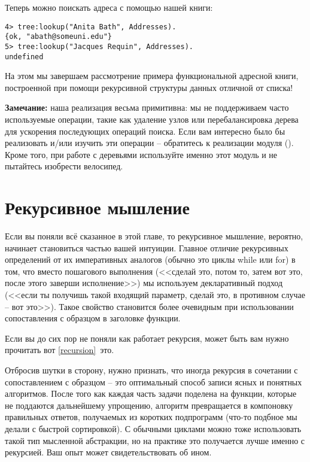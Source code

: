 Теперь можно поискать адреса с помощью нашей книги:
\begin{lstlisting}[style=erlang]
4> tree:lookup("Anita Bath", Addresses).
{ok, "abath@someuni.edu"}
5> tree:lookup("Jacques Requin", Addresses).
undefined
\end{lstlisting}

На этом мы завершаем рассмотрение примера функциональной адресной книги, построенной при помощи рекурсивной структуры данных отличной от списка!\\
\colorbox{lgray}
{
    \begin{minipage}{\linewidth}
\textbf{Замечание:} наша реализация весьма примитивна: мы не поддерживаем часто используемые операции, такие как удаление узлов или перебалансировка дерева для ускорения последующих операций поиска.
Если вам интересно было бы реализовать и/или изучить эти операции \--- обратитесь к реализации модуля  ().
Кроме того, при работе с деревьями используйте именно этот модуль и не пытайтесь изобрести велосипед.
    \end{minipage}
}
\section{Рекурсивное мышление}
Если вы поняли всё сказанное в этой главе, то рекурсивное мышление, вероятно, начинает становиться частью вашей интуиции.
Главное отличие рекурсивных определений от их императивных аналогов (обычно это циклы while или for) в том, что вместо пошагового выполнения (<<сделай это, потом то, затем вот это, после этого заверши исполнение>>) мы используем декларативный подход (<<если ты получишь такой входящий параметр, сделай это, в противном случае \--- вот это>>).
Такое свойство становится более очевидным при использовании сопоставления с образцом в заголовке функции.

Если вы до сих пор не поняли как работает рекурсия, может быть вам нужно прочитать вот \ref{recursion}~это.

Отбросив шутки в сторону, нужно признать, что иногда рекурсия в сочетании с сопоставлением с образцом \--- это оптимальный способ записи ясных и понятных алгоритмов.
После того как каждая часть задачи поделена на функции, которые не поддаются дальнейшему упрощению, алгоритм превращается в компоновку правильных ответов, получаемых из коротких подпрограмм (что\--то подбное мы делали с быстрой сортировкой).
С обычными циклами можно тоже использовать такой тип мысленной абстракции, но на практике это получается лучше именно с рекурсией.
Ваш опыт может свидетельствовать об ином.

